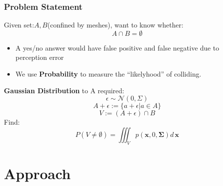 \documentclass{beamer}
\begin{document}

\begin{frame}
	\frametitle{Problem Statement}
	Given set:$A, B$(confined by meshes),
	want to know whether: 
	$$A \cap B = \emptyset$$
	\begin{itemize}
		\item A yes/no answer would have false positive and false negative due to perception error
		\item We use \textbf{Probability} to measure the ``likelyhood'' of colliding.
	\end{itemize}
	\textbf{Gaussian Distribution} to A required:
	$$\epsilon \sim \mathcal{N}(0, \Sigma)$$
	$$A + \epsilon := \{a+\epsilon | a \in A\}$$
	$$V := (A+\epsilon) \cap B$$
	Find: 
	$$P(V \neq \emptyset) = \iiint_Vp(\mathbf{x},0,\mathbf{\Sigma})d\,\mathbf{x}$$
\end{frame}

\section{Approach} %

\end{document}
